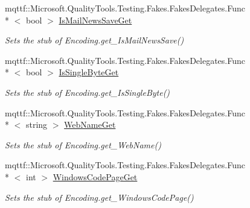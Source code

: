 \begin{DoxyCompactItemize}
mqttf\-::\-Microsoft.\-Quality\-Tools.\-Testing.\-Fakes.\-Fakes\-Delegates.\-Func\\*
$<$ bool $>$ \hyperlink{class_system_1_1_text_1_1_fakes_1_1_stub_u_t_f7_encoding_a0b563ec9f3e23cffd4e332377ce9c1e7}{Is\-Mail\-News\-Save\-Get}
\begin{DoxyCompactList}\small\item\em Sets the stub of Encoding.\-get\-\_\-\-Is\-Mail\-News\-Save()\end{DoxyCompactList}\item 
mqttf\-::\-Microsoft.\-Quality\-Tools.\-Testing.\-Fakes.\-Fakes\-Delegates.\-Func\\*
$<$ bool $>$ \hyperlink{class_system_1_1_text_1_1_fakes_1_1_stub_u_t_f7_encoding_af1d52ee99de2a49c1eff7078f7c14f82}{Is\-Single\-Byte\-Get}
\begin{DoxyCompactList}\small\item\em Sets the stub of Encoding.\-get\-\_\-\-Is\-Single\-Byte()\end{DoxyCompactList}\item 
mqttf\-::\-Microsoft.\-Quality\-Tools.\-Testing.\-Fakes.\-Fakes\-Delegates.\-Func\\*
$<$ string $>$ \hyperlink{class_system_1_1_text_1_1_fakes_1_1_stub_u_t_f7_encoding_a6877ba5f4333f07d0d1dd089867609d1}{Web\-Name\-Get}
\begin{DoxyCompactList}\small\item\em Sets the stub of Encoding.\-get\-\_\-\-Web\-Name()\end{DoxyCompactList}\item 
mqttf\-::\-Microsoft.\-Quality\-Tools.\-Testing.\-Fakes.\-Fakes\-Delegates.\-Func\\*
$<$ int $>$ \hyperlink{class_system_1_1_text_1_1_fakes_1_1_stub_u_t_f7_encoding_a77b89b0399dd9dd928f01078b4718202}{Windows\-Code\-Page\-Get}
\begin{DoxyCompactList}\small\item\em Sets the stub of Encoding.\-get\-\_\-\-Windows\-Code\-Page()\end{DoxyCompactList}\end{DoxyCompactItemize}

